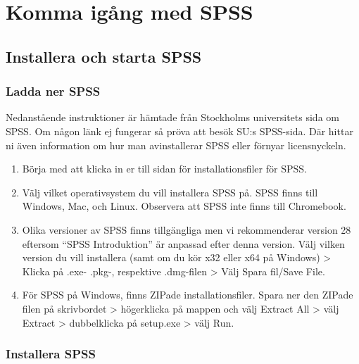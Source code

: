 \documentclass[
]{book}
\begin{document}
\hypertarget{part-komma-iguxe5ng-med-spss}{%
\part*{Komma igång med SPSS}\label{part-komma-iguxe5ng-med-spss}}

\hypertarget{installera-och-starta-spss}{%
\chapter{Installera och starta SPSS}\label{installera-och-starta-spss}}

\hypertarget{ladda-ner-spss}{%
\section{Ladda ner SPSS}\label{ladda-ner-spss}}

Nedanstående instruktioner är hämtade från Stockholms universitets sida om SPSS. Om någon länk ej fungerar så pröva att besök SU:s SPSS-sida. Där hittar ni även information om hur man avinstallerar SPSS eller förnyar licensnyckeln.

\begin{enumerate}
\def\labelenumi{\arabic{enumi}.}
\item
  Börja med att klicka in er till sidan för installationsfiler för SPSS.
\item
  Välj vilket operativsystem du vill installera SPSS på. SPSS finns till Windows, Mac, och Linux. Observera att SPSS inte finns till Chromebook.
\item
  Olika versioner av SPSS finns tillgängliga men vi rekommenderar version 28 eftersom ``SPSS Introduktion'' är anpassad efter denna version. Välj vilken version du vill installera (samt om du kör x32 eller x64 på Windows) \textgreater{} Klicka på .exe- .pkg-, respektive .dmg-filen \textgreater{} Välj Spara fil/Save File.
\item
  För SPSS på Windows, finns ZIPade installationsfiler. Spara ner den ZIPade filen på skrivbordet \textgreater{} högerklicka på mappen och välj Extract All \textgreater{} välj Extract \textgreater{} dubbelklicka på setup.exe \textgreater{} välj Run.
\end{enumerate}

\hypertarget{installera-spss}{%
\section{Installera SPSS}\label{installera-spss}}
\end{document}
